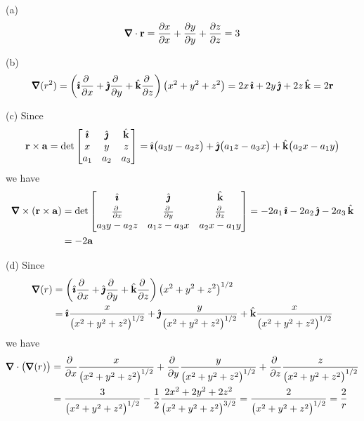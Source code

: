 \begin{solution} (a)
\begin{equation*}
\vnabla\cdot\vr 
=\pdiff{x}{x} 
  +\pdiff{y}{y} 
  +\pdiff{z}{z}
=3 
\end{equation*}

(b)
\begin{equation*}
\vnabla(r^2)
=\left(\hi\pdiff{}{x} 
  +\hj\pdiff{}{y} 
  +\hk\pdiff{}{z} \right)
\big(x^2+y^2+z^2\big)
=2x\,\hi +2y\,\hj +2z\,\hk
=2\vr
\end{equation*}

(c) Since
\begin{equation*}
\mathbf{r}\times\mathbf{a} = \det\left[\begin{matrix}
                         \hat{\pmb{\imath}} & \hat{\pmb{\jmath}} & \hat{\mathbf{k}} \\
                          x  &  y  & z   \\
                         a_1 & a_2 & a_3 
                         \end{matrix}\right]
              =\hat{\pmb{\imath}}\big(a_3y-a_2z\big)
              +\hat{\pmb{\jmath}}\big(a_1z-a_3x\big)
              +\hat{\mathbf{k}}\big(a_2x-a_1y\big)
\end{equation*}
we have
\begin{align*}
\vnabla\times(\vr\times\va)
&= \det\left[\begin{matrix}\hi&\hj&\hk\\[0.03in] 
     \pdiff{}{x}&
        \pdiff{}{y}&
        \pdiff{}{z}\\[0.03in]
    a_3y-a_2z& a_1z-a_3x & a_2x-a_1y\end{matrix}\right] 
=-2a_1\,\hi -2a_2\,\hj -2a_3\,\hk \\
 &=-2\va
\end{align*}

(d) Since
\begin{align*}
\vnabla(r) &= \left(\hi\pdiff{}{x} 
  +\hj\pdiff{}{y} 
  +\hk\pdiff{}{z} \right) \big(x^2+y^2+z^2\big)^{1/2} \\
&=\hi\frac{x}{\big(x^2+y^2+z^2\big)^{1/2}}
  +\hj\frac{y}{\big(x^2+y^2+z^2\big)^{1/2}}
  +\hk\frac{x}{\big(x^2+y^2+z^2\big)^{1/2}}
\end{align*}
we have
\begin{align*}
\vnabla\cdot\big(\vnabla(r)\big)
&= \pdiff{}{x} \frac{x}{\big(x^2+y^2+z^2\big)^{1/2}}
   +\pdiff{}{y} \frac{y}{\big(x^2+y^2+z^2\big)^{1/2}}
   +\pdiff{}{z} \frac{z}{\big(x^2+y^2+z^2\big)^{1/2}} \\
&=  \frac{3}{\big(x^2+y^2+z^2\big)^{1/2}}
   -\frac{1}{2}\frac{2x^2+2y^2+2z^2}{\big(x^2+y^2+z^2\big)^{3/2}}
 =\frac{2}{\big(x^2+y^2+z^2\big)^{1/2}} 
 =\frac{2}{r}
\end{align*} 
\end{solution}

